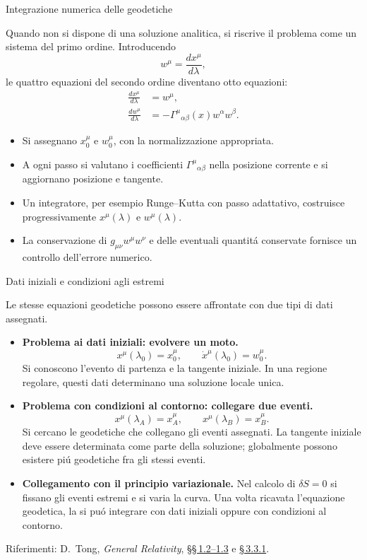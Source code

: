 \begin{frame}[t]{Integrazione numerica delle geodetiche}
\small\raggedright
Quando non si dispone di una soluzione analitica, si riscrive il problema
come un sistema del primo ordine. Introducendo
\[
w^\mu=\frac{dx^\mu}{d\lambda},
\]
le quattro equazioni del secondo ordine diventano otto equazioni:
\[
\boxed{
\begin{aligned}
\frac{dx^\mu}{d\lambda}&=w^\mu,\\[3pt]
\frac{dw^\mu}{d\lambda}
&=-\Gamma^\mu{}_{\alpha\beta}(x)w^\alpha w^\beta.
\end{aligned}}
\]
\begin{itemize}
\item Si assegnano $x_0^\mu$ e $w_0^\mu$, con la normalizzazione appropriata.
\item A ogni passo si valutano i coefficienti $\Gamma^\mu{}_{\alpha\beta}$
nella posizione corrente e si aggiornano posizione e tangente.
\item Un integratore, per esempio Runge--Kutta con passo adattativo,
costruisce progressivamente $x^\mu(\lambda)$ e $w^\mu(\lambda)$.
\item La conservazione di $g_{\mu\nu}w^\mu w^\nu$ e delle eventuali
quantit\'a conservate fornisce un controllo dell'errore numerico.
\end{itemize}
\end{frame}

\begin{frame}[t]{Dati iniziali e condizioni agli estremi}
\small\raggedright
Le stesse equazioni geodetiche possono essere affrontate con due tipi
di dati assegnati.
\begin{itemize}
\item \textbf{Problema ai dati iniziali: evolvere un moto.}
\[
x^\mu(\lambda_0)=x_0^\mu,\qquad
\dot x^\mu(\lambda_0)=w_0^\mu.
\]
Si conoscono l'evento di partenza e la tangente iniziale.
In una regione regolare, questi dati determinano una soluzione locale unica.
\item \textbf{Problema con condizioni al contorno: collegare due eventi.}
\[
x^\mu(\lambda_A)=x_A^\mu,\qquad
x^\mu(\lambda_B)=x_B^\mu.
\]
Si cercano le geodetiche che collegano gli eventi assegnati.
La tangente iniziale deve essere determinata come parte della soluzione;
globalmente possono esistere pi\'u geodetiche fra gli stessi eventi.
\item \textbf{Collegamento con il principio variazionale.}
Nel calcolo di $\delta S=0$ si fissano gli eventi estremi e si varia
la curva. Una volta ricavata l'equazione geodetica, la si pu\'o integrare
con dati iniziali oppure con condizioni al contorno.
\end{itemize}
\medskip
{\scriptsize Riferimenti: D.~Tong, \emph{General Relativity},
\href{https://www.damtp.cam.ac.uk/user/tong/gr/grhtml/S1.html}{\S\S\,1.2--1.3}
e \href{https://www.damtp.cam.ac.uk/user/tong/gr/grhtml/S3.html}{\S\,3.3.1}.}
\end{frame}

